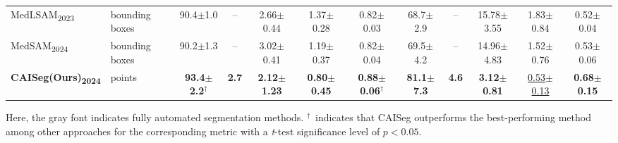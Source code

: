 \documentclass[journal,twoside,web]{ieeecolor}
\begin{document}
\begin{table}[t]
{\begin{tabular}{l l c c c c c c c c c c}
MedLSAM\textsubscript{2023} & bounding boxes & 90.4$\pm$1.0 & -- & 2.66$\pm$0.44 & 1.37$\pm$0.28 & 0.82$\pm$0.03 & 68.7$\pm$2.9 & -- & 15.78$\pm$3.55 & 1.83$\pm$0.84 & 0.52$\pm$0.04\\
MedSAM\textsubscript{2024} & bounding boxes & 90.2$\pm$1.3 & -- & 3.02$\pm$0.41 & 1.19$\pm$0.37 & 0.82$\pm$0.04 & 69.5$\pm$4.2 & -- & 14.96$\pm$4.83 & 1.52$\pm$0.76 & 0.53$\pm$0.06\\
\hline
\textbf{CAISeg(Ours)\textsubscript{2024}} & points & \textbf{93.4$\pm$2.2}$^\dagger$ & \textbf{2.7} & \textbf{2.12$\pm$1.23} & \textbf{0.80$\pm$0.45} & \textbf{0.88$\pm$0.06}$^\dagger$ & \textbf{81.1$\pm$7.3} & \textbf{4.6} & \textbf{3.12$\pm$0.81} & \underline{0.53$\pm$0.13} & \textbf{0.68$\pm$0.15}\\
\hline
\end{tabular}%
} %

\vspace{3pt}
\parbox{0.96\textwidth}{\footnotesize
Here, the gray font indicates fully automated segmentation methods. $^\dagger$~indicates that CAISeg outperforms the best-performing method among other approaches for the corresponding metric with a \emph{t}-test significance level of $p{<}0.05$.
}
\end{table}
\end{document}
